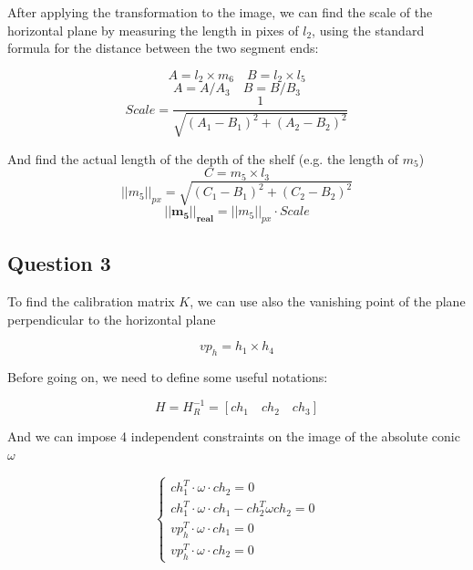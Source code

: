 \documentclass[a4paper, 11pt, oneside, openright, english]{article}
\begin{document}
After applying the transformation to the image, we can find the scale of the horizontal plane by measuring the length in pixes of $l_2$, using the standard formula for the distance between the two segment ends:

\begin{equation*}
    A = l_2 \times m_6 \quad B = l_2 \times l_5
\end{equation*}
\begin{equation*}
    A = A / A_3 \quad B = B / B_3
\end{equation*}
\begin{equation}
    Scale = \frac{1}{\sqrt{(A_1 - B_1)^2 + (A_2 - B_2)^2}}
\end{equation}

\noindent And find the actual length of the depth of the shelf (e.g. the length of $m_5$)
\begin{equation*}
    C = m_5 \times l_3
\end{equation*}
\begin{equation*}
    ||m_5||_{px} = \sqrt{(C_1 - B_1)^2 + (C_2 - B_2)^2}
\end{equation*}
\begin{equation}
    \mathbf{||m_5||_{real}} = ||m_5||_{px} \cdot Scale
\end{equation}

\subsection{Question 3}

To find the calibration matrix $K$, we can use also the vanishing point of the plane perpendicular to the horizontal plane

\begin{equation}
    vp_h = h_1 \times h_4
\end{equation}

\noindent Before going on, we need to define some useful notations:

\begin{equation}
    H = H_R^{-1} = [ch_1 \quad ch_2 \quad ch_3]
\end{equation}

\noindent And we can impose 4 independent constraints on the image of the absolute conic $\omega$

\begin{equation}
    \begin{cases}
        ch_1^T \cdot \omega \cdot ch_2 = 0                      \\
        ch_1^T \cdot \omega \cdot ch_1 - ch_2^T \omega ch_2 = 0 \\
        vp_h^T \cdot \omega \cdot ch_1 = 0                      \\
        vp_h^T \cdot \omega \cdot ch_2 = 0
    \end{cases}
\end{equation}
\end{document}
